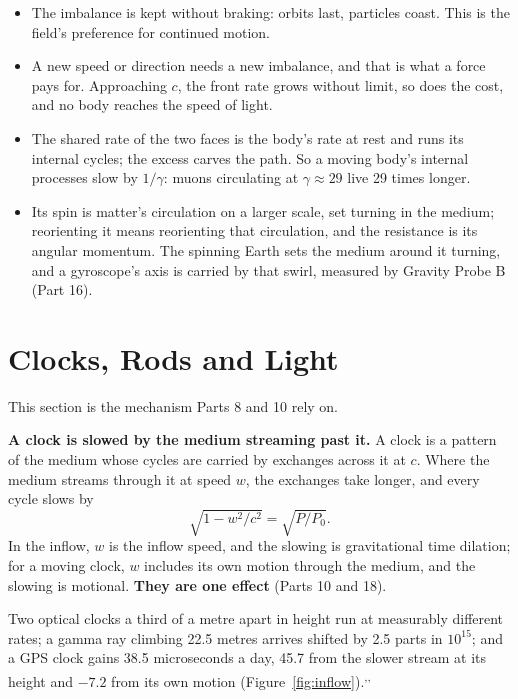 \documentclass[11pt,a4paper]{article}
\begin{document}
\begin{itemize}
\item {} The imbalance is kept without braking: orbits last, particles coast. This is the field's preference for continued motion.
\item {} A new speed or direction needs a new imbalance, and that is what a force pays for. Approaching $c$, the front rate grows without limit, so does the cost, and no body reaches the speed of light.
\item {} The shared rate of the two faces is the body's rate at rest and runs its internal cycles; the excess carves the path. So a moving body's internal processes slow by $1/\gamma$: muons circulating at $\gamma \approx 29$ live 29 times longer.
\item {} Its spin is matter's circulation on a larger scale, set turning in the medium; reorienting it means reorienting that circulation, and the resistance is its angular momentum. The spinning Earth sets the medium around it turning, and a gyroscope's axis is carried by that swirl, measured by Gravity Probe B (Part 16).
\end{itemize}

\section{Clocks, Rods and Light}

This section is the mechanism Parts 8 and 10 rely on.

\begin{hypbar}
\textbf{A clock is slowed by the medium streaming past it.} A clock is a pattern of the medium whose cycles are carried by exchanges across it at $c$. Where the medium streams through it at speed $w$, the exchanges take longer, and every cycle slows by
\[ \sqrt{1 - w^2/c^2} = \sqrt{P/P_0}. \]
In the inflow, $w$ is the inflow speed, and the slowing is gravitational time dilation; for a moving clock, $w$ includes its own motion through the medium, and the slowing is motional. \textbf{They are one effect} (Parts 10 and 18).\footnotemark{}
\end{hypbar}

 Two optical clocks a third of a metre apart in height run at measurably different rates; a gamma ray climbing 22.5 metres arrives shifted by 2.5 parts in $10^{15}$; and a GPS clock gains 38.5 microseconds a day, 45.7 from the slower stream at its height and $-7.2$ from its own motion (Figure~\ref{fig:inflow}).\textsuperscript{,}\textsuperscript{,}
\end{document}
